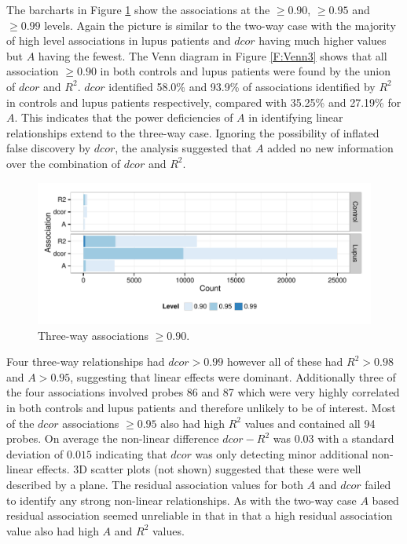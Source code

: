 \documentclass[a4paper, 12pt]{report}
\begin{document}
The barcharts in Figure \ref{F:3wayLevels} show the associations at the $\ge 0.90$, $\ge 0.95$ and $\ge 0.99$ levels. Again the picture is similar to the two-way case with the majority of high level associations in lupus patients and $dcor$ having much higher values but $A$ having the fewest. The Venn diagram in Figure \ref{F:Venn3} shows that all association $\ge 0.90$ in both controls and lupus patients were found by the union of $dcor$ and $R^2$.  $dcor$ identified 58.0\% and 93.9\% of associations identified by $R^2$ in controls and lupus patients respectively, compared with 35.25\% and 27.19\% for $A$. This indicates that the power deficiencies of $A$ in identifying linear relationships extend to the three-way case. Ignoring the possibility of inflated false discovery by $dcor$, the analysis suggested that $A$ added no new information over the combination of $dcor$ and $R^2$.

\begin{figure}[H]
\begin{centering}
\includegraphics[width=\textwidth]{3wayLevels.pdf}
\caption{Three-way associations $\ge 0.90$.} 
\label{F:3wayLevels}
\end{centering}
\end{figure}

Four three-way relationships had $dcor > 0.99$ however all of these had $R^2 > 0.98$ and $A > 0.95$, suggesting that linear effects were dominant. Additionally three of the four associations involved probes 86 and 87 which were very highly correlated in both controls and lupus patients and therefore unlikely to be of interest. Most of the $dcor$ associations $\ge 0.95$ also had high $R^2$ values and contained all 94 probes. On average the non-linear difference $dcor -R^2$ was 0.03 with a standard deviation of $0.015$ indicating that $dcor$ was only detecting minor additional non-linear effects. 3D scatter plots (not shown) suggested that these were  well described by a plane. The residual association values for both $A$ and $dcor$ failed to identify any strong non-linear relationships. As with the two-way case $A$ based residual association seemed unreliable in that in that a high residual association value also had high $A$ and $R^2$ values.
\end{document}
